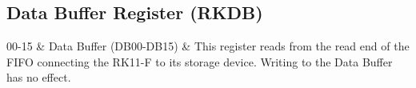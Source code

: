 \subsection{Data Buffer Register (RKDB)}

\begin{register16}
\end{register16}

\begin{bittable}
  00-15 & Data Buffer (DB00-DB15) & This register reads from the read
  end of the FIFO connecting the RK11-F to its storage device.
  Writing to the Data Buffer has no effect. \\
\end{bittable}

